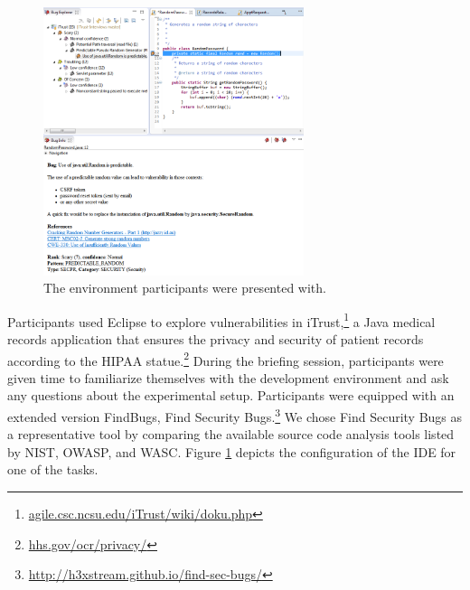 \documentclass[conference]{IEEEtran}
\begin{document}
\begin{figure}
\centering
\includegraphics[width=3in]{Images/environment.png}
\caption{The environment participants were presented with.}
\label{fig:environment} 
\end{figure}
	

Participants used Eclipse to explore vulnerabilities in iTrust,\footnote{\url{agile.csc.ncsu.edu/iTrust/wiki/doku.php}} a Java medical records application that ensures the privacy and security of patient records according to the HIPAA statue.\footnote{\url{hhs.gov/ocr/privacy/}} 
During the briefing session, participants were given time to familiarize themselves with the development environment and ask any questions about the experimental setup.
Participants were equipped with an extended version FindBugs, Find Security Bugs.\footnote{\url{http://h3xstream.github.io/find-sec-bugs/}} 
We chose Find Security Bugs as a representative tool by comparing the available source code analysis tools listed by NIST, OWASP, and WASC.
Figure \ref{fig:environment} depicts the configuration of the IDE for one of the tasks.
\end{document}
